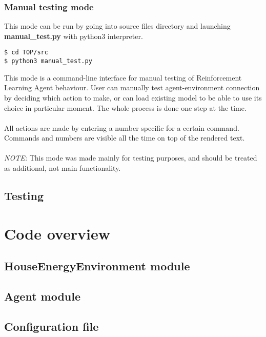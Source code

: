 \documentclass{article}
\begin{document}
\subsubsection{Manual testing mode}
This mode can be run by going into source files directory and launching \textbf{manual\_test.py} with python3 interpreter. 
\begin{lstlisting}
$ cd TOP/src
$ python3 manual_test.py
\end{lstlisting}
This mode is a command-line interface for manual testing of Reinforcement Learning Agent behaviour. User can manually test agent-environment connection by deciding which action to make, or can load existing model to be able to use its choice in particular moment. The whole process is done one step at the time.\\\\
All actions are made by entering a number specific for a certain command. Commands and numbers are visible all the time on top of the rendered text. \\\\
\textit{NOTE:} This mode was made mainly for testing purposes, and should be treated as additional, not main functionality.

\subsection{Testing}
\section{Code overview}
\subsection{HouseEnergyEnvironment module}

\subsection{Agent module}

\subsection{Configuration file}
\end{document}
